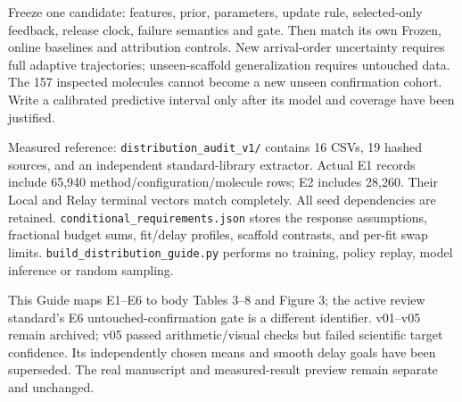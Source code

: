 \documentclass[10pt,letterpaper]{article}
\newcommand{\note}[1]{{\fontsize{8.5}{10.5}\selectfont #1\par}}
\newcommand{\sect}[1]{\vspace{5pt}{\large\bfseries #1}\par\vspace{2pt}}
\begin{document}
\sect{Before filling a prospective result matrix}
Freeze one candidate: features, prior, parameters, update rule, selected-only feedback, release clock,
failure semantics and gate. Then match its own Frozen, online baselines and attribution controls.
New arrival-order uncertainty requires full adaptive trajectories; unseen-scaffold generalization requires
untouched data. The 157 inspected molecules cannot become a new unseen confirmation cohort.
Write a calibrated predictive interval only after its model and coverage have been justified.

\sect{Evidence and reproducibility}
\note{Measured reference: \texttt{distribution\_audit\_v1/} contains 16 CSVs, 19 hashed sources,
and an independent standard-library extractor. Actual E1 records include 65,940 method/configuration/molecule rows;
E2 includes 28,260. Their Local and Relay terminal vectors match completely.
All seed dependencies are retained. \texttt{conditional\_requirements.json} stores the response assumptions,
fractional budget sums, fit/delay profiles, scaffold contrasts, and per-fit swap limits.
\texttt{build\_distribution\_guide.py} performs no training, policy replay, model inference or random sampling.}

\note{This Guide maps E1--E6 to body Tables 3--8 and Figure 3; the active review standard's E6
untouched-confirmation gate is a different identifier. v01--v05 remain archived; v05 passed arithmetic/visual
checks but failed scientific target confidence. Its independently chosen means and smooth delay goals have
been superseded. The real manuscript and measured-result preview remain separate and unchanged.}
\end{document}
